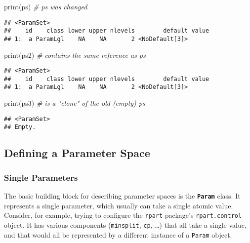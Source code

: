 \documentclass[
]{scrbook}
\newenvironment{Shaded}{\begin{snugshade}}{\end{snugshade}}
\newcommand{\CommentTok}[1]{\textcolor[rgb]{0.56,0.35,0.01}{\textit{#1}}}
\newcommand{\FunctionTok}[1]{\textcolor[rgb]{0.00,0.00,0.00}{#1}}
\newcommand{\NormalTok}[1]{#1}
\renewenvironment{Shaded} {\begin{snugshade}\small} {\end{snugshade}}
\begin{document}
\begin{Shaded}
\begin{Highlighting}[]
\FunctionTok{print}\NormalTok{(ps)  }\CommentTok{\# ps was changed}
\end{Highlighting}
\end{Shaded}

\begin{verbatim}
## <ParamSet>
##    id    class lower upper nlevels        default value
## 1:  a ParamLgl    NA    NA       2 <NoDefault[3]>
\end{verbatim}

\begin{Shaded}
\begin{Highlighting}[]
\FunctionTok{print}\NormalTok{(ps2) }\CommentTok{\# contains the same reference as ps}
\end{Highlighting}
\end{Shaded}

\begin{verbatim}
## <ParamSet>
##    id    class lower upper nlevels        default value
## 1:  a ParamLgl    NA    NA       2 <NoDefault[3]>
\end{verbatim}

\begin{Shaded}
\begin{Highlighting}[]
\FunctionTok{print}\NormalTok{(ps3) }\CommentTok{\# is a "clone" of the old (empty) ps}
\end{Highlighting}
\end{Shaded}

\begin{verbatim}
## <ParamSet>
## Empty.
\end{verbatim}

\hypertarget{defining-a-parameter-space}{%
\subsection{Defining a Parameter Space}\label{defining-a-parameter-space}}

\hypertarget{single-parameters}{%
\subsubsection{Single Parameters}\label{single-parameters}}

The basic building block for describing parameter spaces is the \textbf{\texttt{Param}} class.
It represents a single parameter, which usually can take a single atomic value.
Consider, for example, trying to configure the \texttt{rpart} package's \texttt{rpart.control} object.
It has various components (\texttt{minsplit}, \texttt{cp}, \ldots) that all take a single value, and that would all be represented by a different instance of a \texttt{Param} object.
\end{document}
